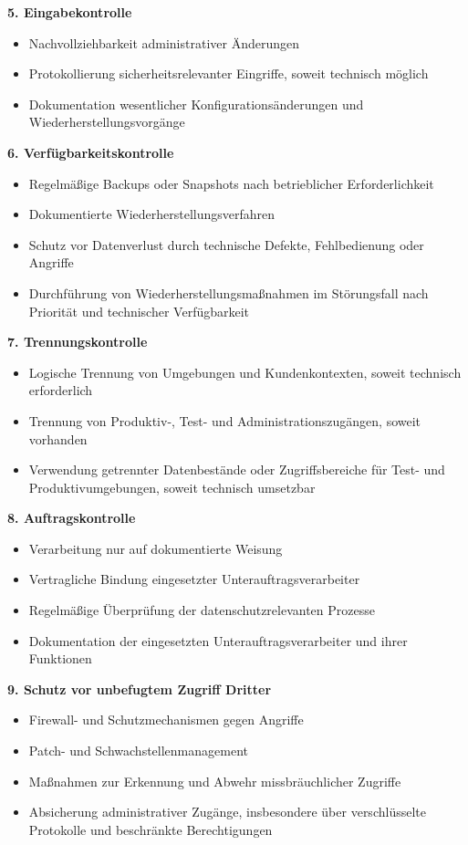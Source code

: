 \documentclass[11pt,a4paper]{article}
\begin{document}
\textbf{5. Eingabekontrolle}
\begin{itemize}
  \item Nachvollziehbarkeit administrativer Änderungen
  \item Protokollierung sicherheitsrelevanter Eingriffe, soweit technisch möglich
  \item Dokumentation wesentlicher Konfigurationsänderungen und Wiederherstellungsvorgänge
\end{itemize}

\textbf{6. Verfügbarkeitskontrolle}
\begin{itemize}
  \item Regelmäßige Backups oder Snapshots nach betrieblicher Erforderlichkeit
  \item Dokumentierte Wiederherstellungsverfahren
  \item Schutz vor Datenverlust durch technische Defekte, Fehlbedienung oder Angriffe
  \item Durchführung von Wiederherstellungsmaßnahmen im Störungsfall nach Priorität und technischer Verfügbarkeit
\end{itemize}

\textbf{7. Trennungskontrolle}
\begin{itemize}
  \item Logische Trennung von Umgebungen und Kundenkontexten, soweit technisch erforderlich
  \item Trennung von Produktiv-, Test- und Administrationszugängen, soweit vorhanden
  \item Verwendung getrennter Datenbestände oder Zugriffsbereiche für Test- und Produktivumgebungen, soweit technisch umsetzbar
\end{itemize}

\textbf{8. Auftragskontrolle}
\begin{itemize}
  \item Verarbeitung nur auf dokumentierte Weisung
  \item Vertragliche Bindung eingesetzter Unterauftragsverarbeiter
  \item Regelmäßige Überprüfung der datenschutzrelevanten Prozesse
  \item Dokumentation der eingesetzten Unterauftragsverarbeiter und ihrer Funktionen
\end{itemize}

\textbf{9. Schutz vor unbefugtem Zugriff Dritter}
\begin{itemize}
  \item Firewall- und Schutzmechanismen gegen Angriffe
  \item Patch- und Schwachstellenmanagement
  \item Maßnahmen zur Erkennung und Abwehr missbräuchlicher Zugriffe
  \item Absicherung administrativer Zugänge, insbesondere über verschlüsselte Protokolle und beschränkte Berechtigungen
\end{itemize}
\end{document}
